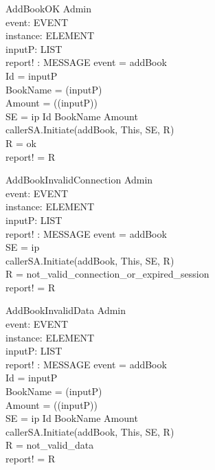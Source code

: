 \begin{schema}{AddBookOK}
\Xi Admin \\
event: EVENT \\
instance: ELEMENT \\
inputP: LIST \\
report! : MESSAGE 
\where event = addBook \\
Id = \head inputP \\
BookName = \head (\tail inputP) \\
Amount = \head (\tail (\tail inputP)) \\
SE = \lseq ip Id BookName Amount \rseq \\
callerSA.Initiate(addBook, This, SE, R) \\
R = ok \\
report! = R 
\end{schema}

\begin{schema}{AddBookInvalidConnection}
\Xi Admin \\
event: EVENT \\
instance: ELEMENT \\
inputP: LIST \\
report! : MESSAGE 
\where event = addBook \\
SE = \lseq ip \rseq \\
callerSA.Initiate(addBook, This, SE, R) \\
R = not\_valid\_connection\_or\_expired\_session \\ 
report! = R
\end{schema}

\begin{schema}{AddBookInvalidData}
\Xi Admin \\
event: EVENT \\
instance: ELEMENT \\
inputP: LIST \\
report! : MESSAGE 
\where event = addBook \\
Id = \head inputP \\
BookName = \head (\tail inputP) \\
Amount = \head (\tail (\tail inputP)) \\
SE = \lseq ip Id BookName Amount \rseq \\
callerSA.Initiate(addBook, This, SE, R) \\
R = not\_valid\_data \\ 
report! = R
\end{schema}


